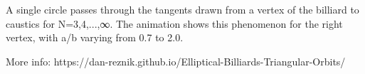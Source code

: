 A single circle passes through the tangents drawn from a vertex of the billiard to caustics for N=3,4,...,∞. The animation shows this phenomenon for the right vertex, with a/b varying from 0.7 to 2.0.

More info: https://dan-reznik.github.io/Elliptical-Billiards-Triangular-Orbits/